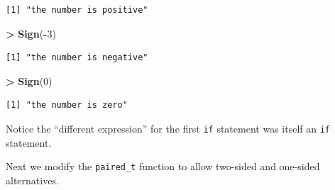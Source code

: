 \documentclass[]{krantz}
\makeatletter
\newenvironment{Shaded}{\begin{snugshade}}{\end{snugshade}}
\newcommand{\DecValTok}[1]{\textcolor[rgb]{0.06,0.06,0.06}{#1}}
\newcommand{\KeywordTok}[1]{\textcolor[rgb]{0.27,0.27,0.27}{\textbf{#1}}}
\newcommand{\NormalTok}[1]{#1}
\newcommand{\OperatorTok}[1]{\textcolor[rgb]{0.43,0.43,0.43}{\textbf{#1}}}
\newcommand{\StringTok}[1]{\textcolor[rgb]{0.5,0.5,0.5}{#1}}
\newenvironment{kframe}{%
\medskip{}
\setlength{\fboxsep}{.8em}
 \def\at@end@of@kframe{}%
 \ifinner\ifhmode%
  \def\at@end@of@kframe{\end{minipage}}%
  \begin{minipage}{\columnwidth}%
 \fi\fi%
 \def\FrameCommand##1{\hskip\@totalleftmargin \hskip-\fboxsep
 \colorbox{shadecolor}{##1}\hskip-\fboxsep
     \hskip-\linewidth \hskip-\@totalleftmargin \hskip\columnwidth}%
 \MakeFramed {\advance\hsize-\width
   \@totalleftmargin\z@ \linewidth\hsize
   \@setminipage}}%
 {\par\unskip\endMakeFramed%
 \at@end@of@kframe}
\renewenvironment{Shaded}{\begin{kframe}}{\end{kframe}}
\makeatother
\begin{document}
\begin{verbatim}
[1] "the number is positive"
\end{verbatim}

\begin{Shaded}
\begin{Highlighting}[]
\OperatorTok{>}\StringTok{ }\KeywordTok{Sign}\NormalTok{(}\OperatorTok{-}\DecValTok{3}\NormalTok{)}
\end{Highlighting}
\end{Shaded}

\begin{verbatim}
[1] "the number is negative"
\end{verbatim}

\begin{Shaded}
\begin{Highlighting}[]
\OperatorTok{>}\StringTok{ }\KeywordTok{Sign}\NormalTok{(}\DecValTok{0}\NormalTok{)}
\end{Highlighting}
\end{Shaded}

\begin{verbatim}
[1] "the number is zero"
\end{verbatim}

Notice the ``different expression'' for the first \texttt{if} statement was itself an \texttt{if} statement.

Next we modify the \texttt{paired\_t} function to allow two-sided and one-sided alternatives.
\end{document}
